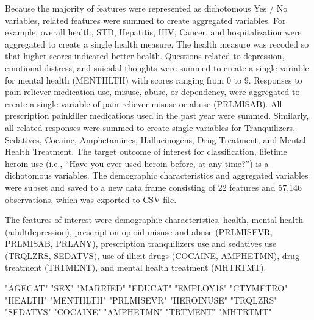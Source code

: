 \documentclass[sigconf]{acmart}
\begin{document}
Because the majority of features were represented as dichotomous Yes / No 
variables, related features were summed to create aggregated variables. For 
example, overall health, STD, Hepatitis, HIV, Cancer, and hospitalization were 
aggregated to create a single health measure. The health measure was recoded
so that higher scores indicated better health. Questions related to depression, 
emotional distress, and suicidal thoughts were summed to create a single 
variable for mental health (MENTHLTH) with scores ranging from 0 to 9. 
Responses to pain reliever medication use, misuse, abuse, or dependency, 
were aggregated to create a single variable of pain reliever misuse or abuse
(PRLMISAB). All prescription painkiller medications used in the past year
were summed. Similarly, all related responses were summed to create single 
variables for Tranquilizers, Sedatives, Cocaine, Amphetamines, Hallucinogens, 
Drug Treatment, and Mental Health Treatment. The target outcome of interest for 
classification, lifetime heroin use (i.e., ``Have you ever used heroin before, 
at any time?'') is a dichotomous variables. The demographic characteristics 
and aggregated variables were subset and saved to a new data frame consisting 
of 22 features and 57,146 observations, which was exported to CSV file. 

The features of interest were demographic 
characteristics, health, mental health (adultdepression), prescription 
opioid misuse and abuse (PRLMISEVR, PRLMISAB, PRLANY), prescription 
tranquilizers use and sedatives use (TRQLZRS, SEDATVS), use of illicit drugs 
(COCAINE, AMPHETMN), drug treatment (TRTMENT), and mental health treatment 
(MHTRTMT). 

"AGECAT"    "SEX"       "MARRIED"   "EDUCAT"    "EMPLOY18"  "CTYMETRO" 
"HEALTH"    "MENTHLTH"  "PRLMISEVR" "HEROINUSE" "TRQLZRS"   "SEDATVS"  
"COCAINE"   "AMPHETMN"  "TRTMENT"   "MHTRTMT"  
\end{document}

